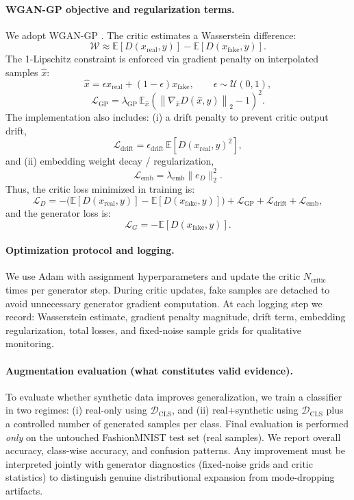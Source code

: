 \paragraph{WGAN-GP objective and regularization terms.}
We adopt WGAN-GP \citep{gulrajani2017improved}. The critic estimates a Wasserstein difference:
\[
\mathcal{W}\approx \mathbb{E}[D(x_{\mathrm{real}},y)]-\mathbb{E}[D(x_{\mathrm{fake}},y)].
\]
The 1-Lipschitz constraint is enforced via gradient penalty on interpolated samples $\hat{x}$:
\[
\hat{x}=\epsilon x_{\mathrm{real}} + (1-\epsilon)x_{\mathrm{fake}},
\qquad \epsilon\sim\mathcal{U}(0,1),
\]
\[
\mathcal{L}_{\mathrm{GP}}=\lambda_{\mathrm{GP}}\,
\mathbb{E}_{\hat{x}}\left(\left\|\nabla_{\hat{x}}D(\hat{x},y)\right\|_2-1\right)^2.
\]
The implementation also includes:
(i) a drift penalty to prevent critic output drift,
\[
\mathcal{L}_{\mathrm{drift}}=\epsilon_{\mathrm{drift}}\,\mathbb{E}\left[D(x_{\mathrm{real}},y)^2\right],
\]
and (ii) embedding weight decay / regularization,
\[
\mathcal{L}_{\mathrm{emb}}=\lambda_{\mathrm{emb}}\|e_D\|_2^2.
\]
Thus, the critic loss minimized in training is:
\[
\mathcal{L}_D=
-\Big(\mathbb{E}[D(x_{\mathrm{real}},y)]-\mathbb{E}[D(x_{\mathrm{fake}},y)]\Big)
+\mathcal{L}_{\mathrm{GP}}+\mathcal{L}_{\mathrm{drift}}+\mathcal{L}_{\mathrm{emb}},
\]
and the generator loss is:
\[
\mathcal{L}_G=-\mathbb{E}[D(x_{\mathrm{fake}},y)].
\]

\paragraph{Optimization protocol and logging.}
We use Adam with assignment hyperparameters and update the critic $N_{\mathrm{critic}}$ times per generator step. During critic updates, fake samples are detached to avoid unnecessary generator gradient computation. At each logging step we record:
Wasserstein estimate, gradient penalty magnitude, drift term, embedding regularization, total losses, and fixed-noise sample grids for qualitative monitoring.

\paragraph{Augmentation evaluation (what constitutes valid evidence).}
To evaluate whether synthetic data improves generalization, we train a classifier in two regimes:
(i) real-only using $\mathcal{D}_{\mathrm{CLS}}$, and
(ii) real+synthetic using $\mathcal{D}_{\mathrm{CLS}}$ plus a controlled number of generated samples per class.
Final evaluation is performed \emph{only} on the untouched FashionMNIST test set (real samples). We report overall accuracy, class-wise accuracy, and confusion patterns. Any improvement must be interpreted jointly with generator diagnostics (fixed-noise grids and critic statistics) to distinguish genuine distributional expansion from mode-dropping artifacts.

